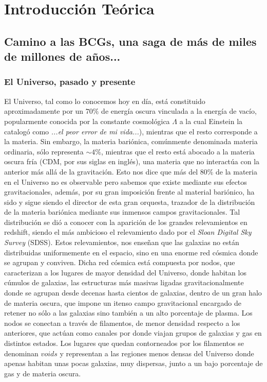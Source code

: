 
\chapter{Introducci\'on Te\'orica} %

\label{ch:introduccion} %

\section{Camino a las BCGs, una saga de m\'as de miles de millones de a\~nos...}

\subsection{El Universo, pasado y presente}
El Universo, tal como lo conocemos hoy en d\'ia, est\'a constituido aproximadamente por un
$70\%$ de energ\'ia oscura vinculada a la energ\'ia de vac\'io,
popularmente conocida por la constante cosmol\'ogica $\Lambda$ a la cual Einstein la catalog\'o como
{\it...el peor 
error de mi vida...}), mientras que el
resto corresponde a la materia. Sin embargo,
la materia bari\'onica,
com\'unmente denominada materia ordinaria, s\'olo representa
$\sim 4\%$, mientras que el resto est\'a
abocado a la materia oscura fr\'ia (CDM, por sus siglas en ingl\'es),
una materia que no interact\'ua con la anterior
m\'as all\'a de la gravitaci\'on. Esto nos dice que m\'as del $80\%$ de 
la materia en el Universo no es observable pero sabemos que existe
mediante sus efectos gravitacionales, adem\'as, por su gran imposici\'on frente 
al material bari\'onico, ha sido y sigue siendo el director de esta gran
orquesta, trazador de la distribuci\'on de la materia bari\'onica 
mediante sus inmensos campos gravitacionales.
Tal distribuci\'on se di\'o a conocer con la aparici\'on de los grandes relevamientos
en redshift, siendo el m\'as ambicioso el relevamiento
dado por el {\it Sloan Digital Sky Survey} (SDSS). Estos relevamientos, nos ense\~nan que las galaxias
no est\'an distribuidas uniformemente en el espacio, sino en una enorme red 
c\'osmica donde se agrupan y conviven.
Dicha red c\'osmica est\'a compuesta por nodos, que caracterizan a los lugares
de mayor densidad del Universo,
donde habitan los c\'umulos de galaxias,
las estructuras m\'as masivas ligadas gravitacionalmente donde se agrupan
desde decenas hasta cientos de galaxias,
dentro de un gran halo de materia oscura, que impone un itenso campo gravitacional
encargado de retener no s\'olo a las galaxias sino tambi\'en a un alto porcentaje de plasma.
Los nodos se conectan a trav\'es de filamentos, de menor densidad respecto a los
anteriores, que act\'uan como canales 
por donde viajan grupos de galaxias y gas en distintos estados.
Los lugares que quedan contorneados por los filamentos se denominan $voids$ y
representan a las regiones menos densas del Universo donde
apenas habitan unas pocas galaxias, muy dispersas, junto a un bajo porcentaje
de gas y de materia oscura.


